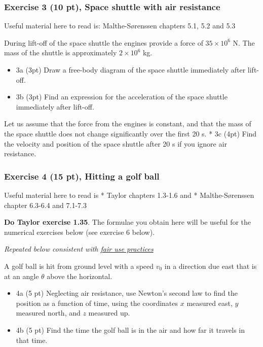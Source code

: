 \documentclass[11pt]{article}
\providecommand{\tightlist}{%
      \setlength{\itemsep}{0pt}\setlength{\parskip}{0pt}}
\begin{document}
    \subsubsection{Exercise 3 (10 pt), Space shuttle with air
resistance}\label{exercise-3-10-pt-space-shuttle-with-air-resistance}

Useful material here to read is: Malthe-Sørenssen chapters 5.1, 5.2 and
5.3

During lift-off of the space shuttle the engines provide a force of
\(35\times 10^{6}\) N. The mass of the shuttle is approximately
\(2\times 10^6\) kg.

\begin{itemize}
\item
  3a (3pt) Draw a free-body diagram of the space shuttle immediately
  after lift-off.
\item
  3b (3pt) Find an expression for the acceleration of the space shuttle
  immediately after lift-off.
\end{itemize}

Let us assume that the force from the engines is constant, and that the
mass of the space shuttle does not change significantly over the first
20 s. * 3c (4pt) Find the velocity and position of the space shuttle
after 20 s if you ignore air resistance.

    \subsubsection{Exercise 4 (15 pt), Hitting a golf
ball}\label{exercise-4-15-pt-hitting-a-golf-ball}

Useful material here to read is * Taylor chapters 1.3-1.6 and *
Malthe-Sørenssen chapter 6.3-6.4 and 7.1-7.3

\textbf{Do Taylor exercise 1.35}. The formulae you obtain here will be
useful for the numerical exercises below (see exercise 6 below).

\emph{Repeated below consistent with
\href{https://en.wikipedia.org/wiki/Fair_use}{fair use practices}}

A golf ball is hit from ground level with a speed \(v_0\) in a direction
due east that is at an angle \(\theta\) above the horizontal.

\begin{itemize}
\tightlist
\item
  4a (5 pt) Neglecting air resistance, use Newton's second law to find
  the position as a function of time, using the coordinates \(x\)
  measured east, \(y\) measured north, and \(z\) measured up.
\item
  4b (5 pt) Find the time the golf ball is in the air and how far it
  travels in that time.
\end{itemize}
\end{document}
